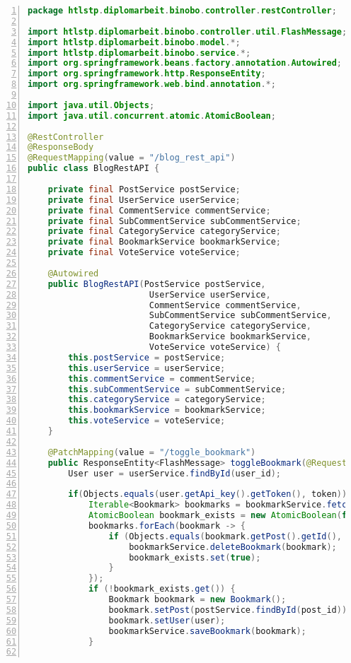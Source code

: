 \documentclass[paper=a4,12pt]{scrreprt}
\begin{document}
\begin{lstlisting}[caption={Blog - REST API}, captionpos=b, label={listing:restcontroller_blog}, language=java, numbers=left,
  stepnumber=1]
package htlstp.diplomarbeit.binobo.controller.restController;

import htlstp.diplomarbeit.binobo.controller.util.FlashMessage;
import htlstp.diplomarbeit.binobo.model.*;
import htlstp.diplomarbeit.binobo.service.*;
import org.springframework.beans.factory.annotation.Autowired;
import org.springframework.http.ResponseEntity;
import org.springframework.web.bind.annotation.*;

import java.util.Objects;
import java.util.concurrent.atomic.AtomicBoolean;

@RestController
@ResponseBody
@RequestMapping(value = "/blog_rest_api")
public class BlogRestAPI {

    private final PostService postService;
    private final UserService userService;
    private final CommentService commentService;
    private final SubCommentService subCommentService;
    private final CategoryService categoryService;
    private final BookmarkService bookmarkService;
    private final VoteService voteService;

    @Autowired
    public BlogRestAPI(PostService postService,
                        UserService userService,
                        CommentService commentService,
                        SubCommentService subCommentService,
                        CategoryService categoryService,
                        BookmarkService bookmarkService,
                        VoteService voteService) {
        this.postService = postService;
        this.userService = userService;
        this.commentService = commentService;
        this.subCommentService = subCommentService;
        this.categoryService = categoryService;
        this.bookmarkService = bookmarkService;
        this.voteService = voteService;
    }

    @PatchMapping(value = "/toggle_bookmark")
    public ResponseEntity<FlashMessage> toggleBookmark(@RequestParam("post_id") Long post_id, @RequestParam("user_id") Long user_id, @RequestParam("api_key") String token){
        User user = userService.findById(user_id);

        if(Objects.equals(user.getApi_key().getToken(), token)) {
            Iterable<Bookmark> bookmarks = bookmarkService.fetchAllBookmarksFromUser(user);
            AtomicBoolean bookmark_exists = new AtomicBoolean(false);
            bookmarks.forEach(bookmark -> {
                if (Objects.equals(bookmark.getPost().getId(), post_id)){
                    bookmarkService.deleteBookmark(bookmark);
                    bookmark_exists.set(true);
                }
            });
            if (!bookmark_exists.get()) {
                Bookmark bookmark = new Bookmark();
                bookmark.setPost(postService.findById(post_id));
                bookmark.setUser(user);
                bookmarkService.saveBookmark(bookmark);
            }


\end{lstlisting}
\end{document}
